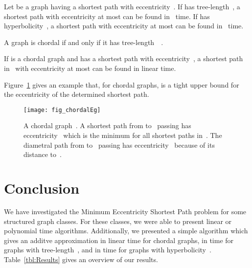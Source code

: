 \documentclass[10pt]{llncs}
\begin{document}
\begin{theorem}
Let  be a graph having a shortest path with eccentricity~.
If  has tree-length~, a shortest path with eccentricity at most  can be found in ~time.
If  has hyperbolicity~, a shortest path with eccentricity at most  can be found in ~time.
\end{theorem}

A graph is chordal if and only if it has tree-length~~\cite{Gavril1974}.

\begin{corollary}
If  is a chordal graph and has a shortest path with eccentricity~, a shortest path in~ with eccentricity at most  can be found in linear time.
\end{corollary}

Figure~\ref{fig:chordalEg} gives an example that, for chordal graphs,  is a tight upper bound for the eccentricity of the determined shortest path.

\begin{figure}
    [htb]
    \centering
    \texttt{[image: fig\_chordalEg]}\caption
    {
        A chordal graph~.
        A shortest path from  to~ passing  has eccentricity~ which is the minimum for all shortest paths in~.
        The diametral path from  to~ passing  has eccentricity~ because of its distance to~.
    }
    \label{fig:chordalEg}
\end{figure}

\section{Conclusion}

We have investigated the Minimum Eccentricity Shortest Path problem for some structured graph classes.
For these classes, we were able to present linear or polynomial time algorithms.
Additionally, we presented a simple algorithm which gives an additve approximation in linear time for chordal graphs, in  time for graphs with tree-length~, and in  time for graphs with hyperbolicity~.
Table~\ref{tbl:Results} gives an overview of our results.
\end{document}
